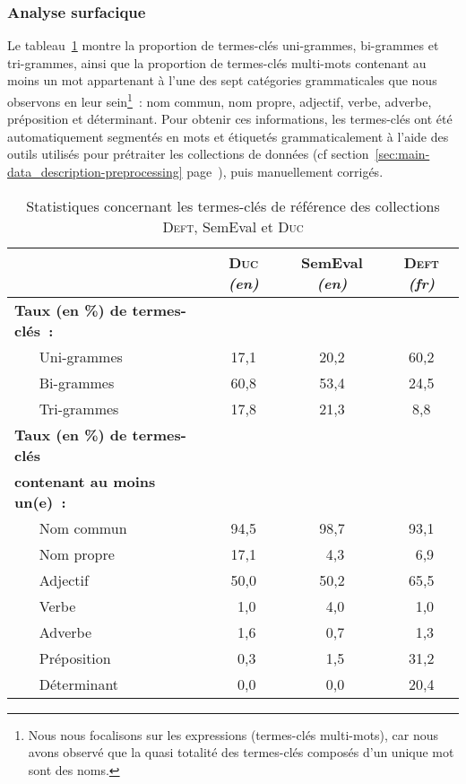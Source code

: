       \subsubsection{Analyse surfacique}
      \label{subsubsec:main:domain_independent_keyphrase_extraction-keyphrase_candidate_selection-analysis_of_keyphrase_properties-shalow_analysis}
      Le tableau~\ref{tab:candidate_selection-train_stats} montre la
      proportion de termes-clés uni-grammes, bi-grammes et tri-grammes, ainsi
      que la proportion de termes-clés multi-mots contenant au moins un mot
      appartenant à l'une des sept catégories grammaticales que nous observons
      en leur sein\footnote{ Nous nous focalisons sur les expressions
      (termes-clés multi-mots), car nous avons observé que la quasi totalité des
      termes-clés composés d'un unique mot sont des noms. }~: nom commun, nom
      propre, adjectif, verbe, adverbe, préposition et déterminant. Pour obtenir
      ces informations, les termes-clés ont été automatiquement segmentés en
      mots et étiquetés grammaticalement à l'aide des outils utilisés pour
      prétraiter les collections de données (cf
      section~\ref{sec:main-data_description-preprocessing}
      page~\pageref{sec:main-data_description-preprocessing}), puis manuellement
      corrigés.
      \begin{table}[!h]
        \centering
        \begin{tabular}{ll|ccc}
          \toprule
          & & \textbf{\textsc{Duc}} \textit{(en)} & \textbf{SemEval} \textit{(en)} & \textbf{\textsc{Deft}} \textit{(fr)}\\
          \hline
          \multicolumn{2}{l|}{\textbf{Taux (en \%) de termes-clés~:}}\\
          & Uni-grammes & 17,1 & 20,2 & 60,2\\
          & Bi-grammes & 60,8 & 53,4 & 24,5\\
          & Tri-grammes & 17,8 & 21,3 & 8,8\\
          \hline
          \multicolumn{2}{l|}{\textbf{Taux (en \%) de termes-clés}} & & &\\
          \multicolumn{2}{l|}{\textbf{contenant au moins un(e)~:}} & & &\\
          & Nom commun & 94,5 & 98,7 & 93,1\\
          & Nom propre & 17,1 & $~~$4,3 & $~~$6,9\\
          & Adjectif & 50,0 & 50,2 & 65,5\\
          & Verbe & $~~$1,0 & $~~$4,0 & $~~$1,0\\
          & Adverbe & $~~$1,6 & $~~$0,7 & $~~$1,3\\
          & Préposition & $~~$0,3 & $~~$1,5 & 31,2\\
          & Déterminant & $~~$0,0 & $~~$0,0 & 20,4\\
          \bottomrule
        \end{tabular}
        \caption{Statistiques concernant les termes-clés de référence des
                 collections \textsc{Deft}, SemEval et \textsc{Duc}
                 \label{tab:candidate_selection-train_stats}}
      \end{table}

